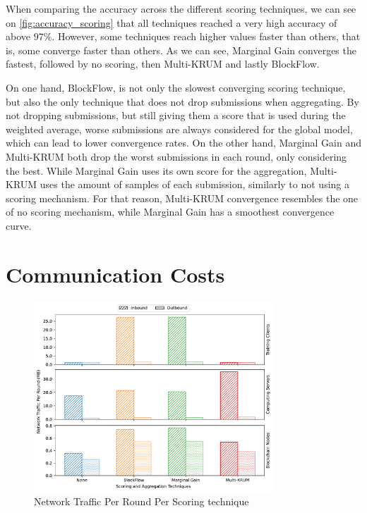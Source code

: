 When comparing the accuracy across the different scoring techniques, we can see on \autoref{fig:accuracy_scoring} that all techniques reached a very high accuracy of above $97\%$. However, some techniques reach higher values faster than others, that is, some converge faster than others. As we can see, Marginal Gain converges the fastest, followed by no scoring, then Multi-KRUM and lastly BlockFlow.

On one hand, BlockFlow, is not only the slowest converging scoring technique, but also the only technique that does not drop submissions when aggregating. By not dropping submissions, but still giving them a score that is used during the weighted average, worse submissions are always considered for the global model, which can lead to lower convergence rates. 
On the other hand, Marginal Gain and Multi-KRUM both drop the worst submissions in each round, only considering the best. While Marginal Gain uses its own score for the aggregation, Multi-KRUM uses the amount of samples of each submission, similarly to not using a scoring mechanism. For that reason, Multi-KRUM convergence resembles the one of no scoring mechanism, while Marginal Gain has a smoothest convergence curve.

\section{Communication Costs}

\begin{figure}[!ht]
    \centering
    \centering
    \includegraphics[width=0.8\textwidth]{graphics/04_scoring_net.pdf}
    \caption{Network Traffic Per Round Per Scoring technique}
    \label{fig:net_participants}
\end{figure}

